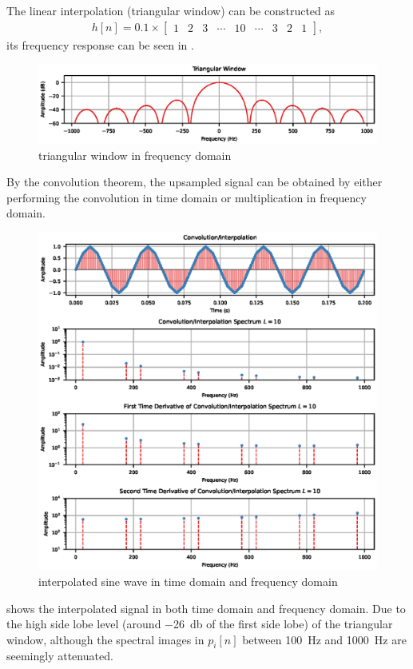 The linear interpolation (triangular window) can be constructed as
\begin{gather}
h[n]=0.1\times\begin{bmatrix}
1&2&3&\cdots&10&\cdots&3&2&1
\end{bmatrix},
\end{gather}
its frequency response can be seen in .
\begin{figure}[H]
\centering
\includegraphics{PIC/TriangularWindow}
\caption{triangular window in frequency domain}\label{fig:tri_window}
\end{figure}

By the convolution theorem, the upsampled signal can be obtained by either performing the convolution in time domain or multiplication in frequency domain.
\begin{figure}[H]
\centering
\includegraphics{PIC/Convolution}
\caption{interpolated sine wave in time domain and frequency domain}\label{fig:interpolated}
\end{figure}
 shows the interpolated signal in both time domain and frequency domain. Due to the high side lobe level (around \SI{-26}{\decibel} of the first side lobe) of the triangular window, although the spectral images in $p_i[n]$ between \SI{100}{\hertz} and \SI{1000}{\hertz} are seemingly attenuated.

